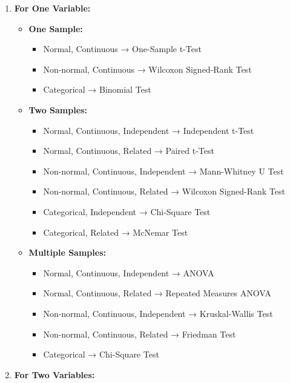 \documentclass[
  letterpaper,
]{book}
\providecommand{\tightlist}{%
  \setlength{\itemsep}{0pt}\setlength{\parskip}{0pt}}
\begin{document}
\begin{enumerate}
\def\labelenumi{\arabic{enumi}.}
\tightlist
\item
  \textbf{For One Variable:}

  \begin{itemize}
  \tightlist
  \item
    \textbf{One Sample:}

    \begin{itemize}
    \tightlist
    \item
      Normal, Continuous → One-Sample t-Test
    \item
      Non-normal, Continuous → Wilcoxon Signed-Rank Test
    \item
      Categorical → Binomial Test
    \end{itemize}
  \item
    \textbf{Two Samples:}

    \begin{itemize}
    \tightlist
    \item
      Normal, Continuous, Independent → Independent t-Test
    \item
      Normal, Continuous, Related → Paired t-Test
    \item
      Non-normal, Continuous, Independent → Mann-Whitney U Test
    \item
      Non-normal, Continuous, Related → Wilcoxon Signed-Rank Test
    \item
      Categorical, Independent → Chi-Square Test
    \item
      Categorical, Related → McNemar Test
    \end{itemize}
  \item
    \textbf{Multiple Samples:}

    \begin{itemize}
    \tightlist
    \item
      Normal, Continuous, Independent → ANOVA
    \item
      Normal, Continuous, Related → Repeated Measures ANOVA
    \item
      Non-normal, Continuous, Independent → Kruskal-Wallis Test
    \item
      Non-normal, Continuous, Related → Friedman Test
    \item
      Categorical → Chi-Square Test
    \end{itemize}
  \end{itemize}
\item
  \textbf{For Two Variables:}


\end{enumerate}
\end{document}
